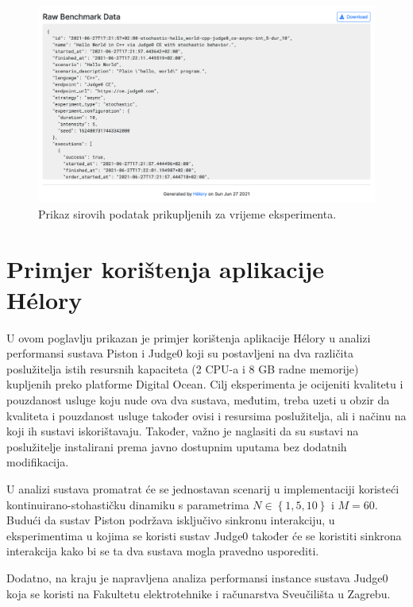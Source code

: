 \documentclass[times, utf8, diplomski]{fer}
\begin{document}
\begin{figure}[htb]
	\centering
	\includegraphics[width=\textwidth]{images/Report UI 4.png}
	\caption{
		Prikaz sirovih podatak prikupljenih za vrijeme eksperimenta.
	}
	\label{fig:report-raw-data}
\end{figure}

\chapter{Primjer korištenja aplikacije Hélory}
\label{chap:use}
U ovom poglavlju prikazan je primjer korištenja aplikacije Hélory u analizi performansi sustava Piston i Judge0 koji su postavljeni na dva različita poslužitelja istih resursnih kapaciteta (2 CPU-a i 8 GB radne memorije) kupljenih preko platforme Digital Ocean. Cilj eksperimenta je ocijeniti kvalitetu i pouzdanost usluge koju nude ova dva sustava, međutim, treba uzeti u obzir da kvaliteta i pouzdanost usluge također ovisi i resursima poslužitelja, ali i načinu na koji ih sustavi iskorištavaju. Također, važno je naglasiti da su sustavi na poslužitelje instalirani prema javno dostupnim uputama bez dodatnih modifikacija.

U analizi sustava promatrat će se jednostavan scenarij u  implementaciji koristeći kontinuirano-stohastičku dinamiku s parametrima $N \in \left\{1,5,10\right\}$ i $M=60$. Budući da sustav Piston podržava isključivo sinkronu interakciju, u eksperimentima u kojima se koristi sustav Judge0 također će se koristiti sinkrona interakcija kako bi se ta dva sustava mogla pravedno usporediti.

Dodatno, na kraju je napravljena analiza performansi instance sustava Judge0 koja se koristi na Fakultetu elektrotehnike i računarstva Sveučilišta u Zagrebu.
\end{document}

